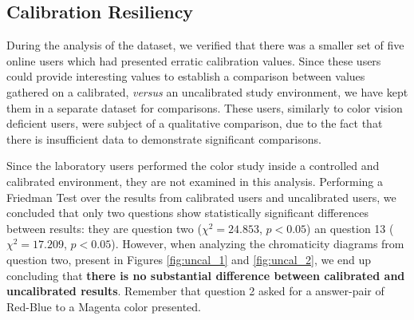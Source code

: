 \subsection{Calibration Resiliency}
\label{subsec:results_calibration}
%
During the analysis of the dataset, we verified that there was a smaller set of five online users which had presented erratic calibration
values. Since these users could provide interesting values to establish a comparison between values gathered on a calibrated,
\emph{versus} an uncalibrated study environment, we have kept them in a separate dataset for comparisons. These users, similarly to color
vision deficient users, were subject of a qualitative comparison, due to the fact that there is insufficient data to demonstrate significant
comparisons. \par
%
Since the laboratory users performed the color study inside a controlled and calibrated environment, they are not examined in this analysis.
Performing a Friedman Test over the results from calibrated users and uncalibrated users, we concluded that only two questions
show statistically significant differences between results: they are question two ($\chi^2 = 24.853$, $p < 0.05$) an question 13
($\chi^2 = 17.209$, $p < 0.05$). However, when analyzing the chromaticity diagrams from question two, present in Figures \ref{fig:uncal_1}
and \ref{fig:uncal_2}, we end up concluding that \textbf{there is no substantial difference between calibrated and uncalibrated results}.
Remember that question 2 asked for a answer-pair of Red-Blue to a Magenta color presented.
%
